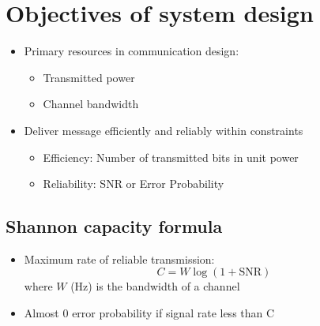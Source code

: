 \documentclass[conference]{IEEEtran}
\begin{document}
\pagebreak
\section{Objectives of system design}

\begin{itemize}
    \item Primary resources in communication design:
    \begin{itemize}
        \item Transmitted power 
        \item Channel bandwidth 
    \end{itemize}

    \item Deliver message efficiently and reliably within constraints
    \begin{itemize}
        \item Efficiency: Number of transmitted bits in unit power 
        \item Reliability: SNR or Error Probability
    \end{itemize}
\end{itemize}

\subsection{Shannon capacity formula}

\begin{itemize}
    \item Maximum rate of reliable transmission: 
    $$
        C = W\log(1+\text{SNR})
    $$
    where $W$ (Hz) is the bandwidth of a channel 

    \item Almost $0$ error probability if signal rate less than C 
\end{itemize}




\end{document}
